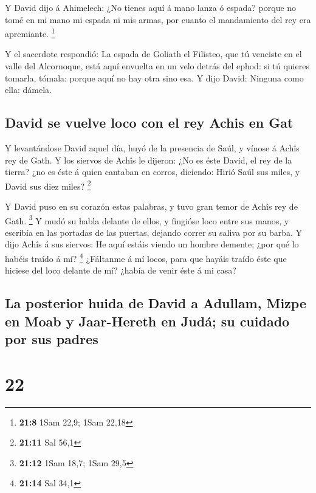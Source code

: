  Y David dijo á Ahimelech: ¿No tienes aquí á mano lanza ó
espada? porque no tomé en mi mano mi espada ni mis armas, por cuanto el
mandamiento del rey era apremiante. \footnote{\textbf{21:8} 1Sam 22,9;
  1Sam 22,18}

 Y el sacerdote respondió: La espada de Goliath el Filisteo,
que tú venciste en el valle del Alcornoque, está aquí envuelta en un
velo detrás del ephod: si tú quieres tomarla, tómala: porque aquí no hay
otra sino esa. Y dijo David: Ninguna como ella: dámela.

\hypertarget{david-se-vuelve-loco-con-el-rey-achis-en-gat}{%
\subsection{David se vuelve loco con el rey Achis en
Gat}\label{david-se-vuelve-loco-con-el-rey-achis-en-gat}}

 Y levantándose David aquel día, huyó de la presencia de
Saúl, y vínose á Achîs rey de Gath.  Y los siervos de Achîs
le dijeron: ¿No es éste David, el rey de la tierra? ¿no es éste á quien
cantaban en corros, diciendo: Hirió Saúl sus miles, y David sus diez
miles? \footnote{\textbf{21:11} Sal 56,1}

 Y David puso en su corazón estas palabras, y tuvo gran
temor de Achîs rey de Gath. \footnote{\textbf{21:12} 1Sam 18,7; 1Sam
  29,5}  Y mudó su habla delante de ellos, y fingióse loco
entre sus manos, y escribía en las portadas de las puertas, dejando
correr su saliva por su barba.  Y dijo Achîs á sus siervos:
He aquí estáis viendo un hombre demente; ¿por qué lo habéis traído á mí?
\footnote{\textbf{21:14} Sal 34,1}  ¿Fáltanme á mí locos,
para que hayáis traído éste que hiciese del loco delante de mí? ¿había
de venir éste á mi casa?

\hypertarget{la-posterior-huida-de-david-a-adullam-mizpe-en-moab-y-jaar-hereth-en-juduxe1-su-cuidado-por-sus-padres}{%
\subsection{La posterior huida de David a Adullam, Mizpe en Moab y
Jaar-Hereth en Judá; su cuidado por sus
padres}\label{la-posterior-huida-de-david-a-adullam-mizpe-en-moab-y-jaar-hereth-en-juduxe1-su-cuidado-por-sus-padres}}

\hypertarget{section-21}{%
\section{22}\label{section-21}}

